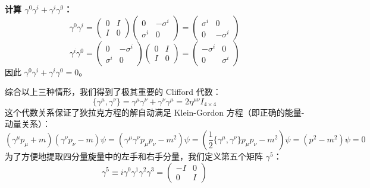 \textbf{计算 $\gamma^0 \gamma^i + \gamma^i \gamma^0$：}
\begin{equation}
    \gamma^0 \gamma^i = \begin{pmatrix} 0 & I \\ I & 0 \end{pmatrix} \begin{pmatrix} 0 & -\sigma^i \\ \sigma^i & 0 \end{pmatrix} = \begin{pmatrix} \sigma^i & 0 \\ 0 & -\sigma^i \end{pmatrix}
\end{equation}
\begin{equation}
    \gamma^i \gamma^0 = \begin{pmatrix} 0 & -\sigma^i \\ \sigma^i & 0 \end{pmatrix} \begin{pmatrix} 0 & I \\ I & 0 \end{pmatrix} = \begin{pmatrix} -\sigma^i & 0 \\ 0 & \sigma^i \end{pmatrix}
\end{equation}
因此 $\gamma^0 \gamma^i + \gamma^i \gamma^0 = 0$。
\vspace{2ex}\par 
综合以上三种情形，我们得到了极其重要的 Clifford 代数：
\begin{equation}
    \boxed{\{\gamma^\mu, \gamma^\nu\} = \gamma^\mu \gamma^\nu + \gamma^\nu \gamma^\mu = 2\eta^{\mu\nu} I_{4\times 4}} \label{eq:clifford}
\end{equation}
这个代数关系保证了狄拉克方程的解自动满足 Klein-Gordon 方程（即正确的能量-动量关系）：
\begin{equation}
    (\gamma^\mu p_\mu + m)(\gamma^\nu p_\nu - m)\psi = (\gamma^\mu \gamma^\nu p_\mu p_\nu - m^2)\psi = \left(\frac{1}{2}\{\gamma^\mu,\gamma^\nu\}p_\mu p_\nu - m^2\right)\psi = (p^2 - m^2)\psi = 0
\end{equation}
为了方便地提取四分量旋量中的左手和右手分量，我们定义第五个矩阵 $\gamma^5$：
\begin{equation}
    \gamma^5 \equiv i\gamma^0\gamma^1\gamma^2\gamma^3 = \begin{pmatrix} -I & 0 \\ 0 & I \end{pmatrix}
\end{equation}
